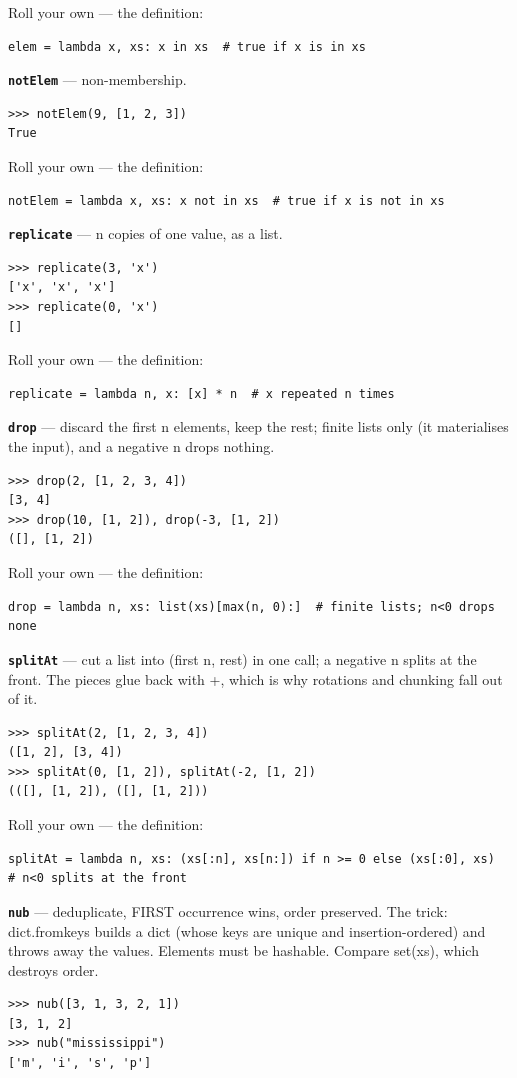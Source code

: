 \documentclass[10pt,letterpaper]{article}
\begin{document}
Roll your own --- the definition:

\begin{lstlisting}[style=ex]
elem = lambda x, xs: x in xs  # true if x is in xs
\end{lstlisting}
\textbf{\texttt{notElem}} --- non-membership.
\begin{lstlisting}[style=ex]
>>> notElem(9, [1, 2, 3])
True
\end{lstlisting}

Roll your own --- the definition:

\begin{lstlisting}[style=ex]
notElem = lambda x, xs: x not in xs  # true if x is not in xs
\end{lstlisting}
\textbf{\texttt{replicate}} --- n copies of one value, as a list.
\begin{lstlisting}[style=ex]
>>> replicate(3, 'x')
['x', 'x', 'x']
>>> replicate(0, 'x')
[]
\end{lstlisting}

Roll your own --- the definition:

\begin{lstlisting}[style=ex]
replicate = lambda n, x: [x] * n  # x repeated n times
\end{lstlisting}
\textbf{\texttt{drop}} --- discard the first n elements, keep the rest; finite lists only (it materialises the input), and a negative n drops nothing.
\begin{lstlisting}[style=ex]
>>> drop(2, [1, 2, 3, 4])
[3, 4]
>>> drop(10, [1, 2]), drop(-3, [1, 2])
([], [1, 2])
\end{lstlisting}

Roll your own --- the definition:

\begin{lstlisting}[style=ex]
drop = lambda n, xs: list(xs)[max(n, 0):]  # finite lists; n<0 drops none
\end{lstlisting}
\textbf{\texttt{splitAt}} --- cut a list into (first n, rest) in one call; a negative n splits at the front. The pieces glue back with +, which is why rotations and chunking fall out of it.
\begin{lstlisting}[style=ex]
>>> splitAt(2, [1, 2, 3, 4])
([1, 2], [3, 4])
>>> splitAt(0, [1, 2]), splitAt(-2, [1, 2])
(([], [1, 2]), ([], [1, 2]))
\end{lstlisting}

Roll your own --- the definition:

\begin{lstlisting}[style=ex]
splitAt = lambda n, xs: (xs[:n], xs[n:]) if n >= 0 else (xs[:0], xs)  # n<0 splits at the front
\end{lstlisting}
\textbf{\texttt{nub}} --- deduplicate, FIRST occurrence wins, order preserved. The trick: dict.fromkeys builds a dict (whose keys are unique and insertion-ordered) and throws away the values. Elements must be hashable. Compare set(xs), which destroys order.
\begin{lstlisting}[style=ex]
>>> nub([3, 1, 3, 2, 1])
[3, 1, 2]
>>> nub("mississippi")
['m', 'i', 's', 'p']
\end{lstlisting}
\end{document}
